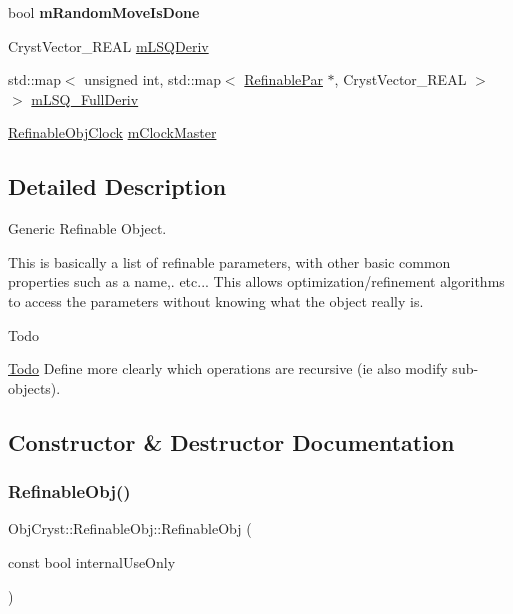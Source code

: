 \begin{DoxyCompactItemize}
\mbox{\label{class_obj_cryst_1_1_refinable_obj_aab4b8fa7fc23598d79351ebd500beb3e}} 
bool {\bfseries m\+Random\+Move\+Is\+Done}
\item 
Cryst\+Vector\+\_\+\+R\+E\+AL \mbox{\hyperlink{class_obj_cryst_1_1_refinable_obj_a20a9cbc22a6b81f95dc66ebd0ed1668d}{m\+L\+S\+Q\+Deriv}}
\item 
std\+::map$<$ unsigned int, std\+::map$<$ \mbox{\hyperlink{class_obj_cryst_1_1_refinable_par}{Refinable\+Par}} $\ast$, Cryst\+Vector\+\_\+\+R\+E\+AL $>$ $>$ \mbox{\hyperlink{class_obj_cryst_1_1_refinable_obj_a7fded30f5419980ea110a651d6617cc0}{m\+L\+S\+Q\+\_\+\+Full\+Deriv}}
\item 
\mbox{\hyperlink{class_obj_cryst_1_1_refinable_obj_clock}{Refinable\+Obj\+Clock}} \mbox{\hyperlink{class_obj_cryst_1_1_refinable_obj_acbb5e80371ef0c72ef1bd8559226ae22}{m\+Clock\+Master}}
\end{DoxyCompactItemize}


\subsection{Detailed Description}
Generic Refinable Object. 

This is basically a list of refinable parameters, with other basic common properties such as a name,. etc... This allows optimization/refinement algorithms to access the parameters without knowing what the object really is.

\begin{DoxyRefDesc}{Todo}
\item[\mbox{\hyperlink{todo__todo000003}{Todo}}]Define more clearly which operations are recursive (ie also modify sub-\/objects). \end{DoxyRefDesc}


\subsection{Constructor \& Destructor Documentation}
\mbox{\label{class_obj_cryst_1_1_refinable_obj_aa0eaf0982686476cbec02a8afeebc92d}} 
\subsubsection{\texorpdfstring{RefinableObj()}{RefinableObj()}\hspace{0.1cm}{\footnotesize\ttfamily [1/2]}}
{\footnotesize\ttfamily Obj\+Cryst\+::\+Refinable\+Obj\+::\+Refinable\+Obj (\begin{DoxyParamCaption}\item[{const bool}]{internal\+Use\+Only }\end{DoxyParamCaption})}

